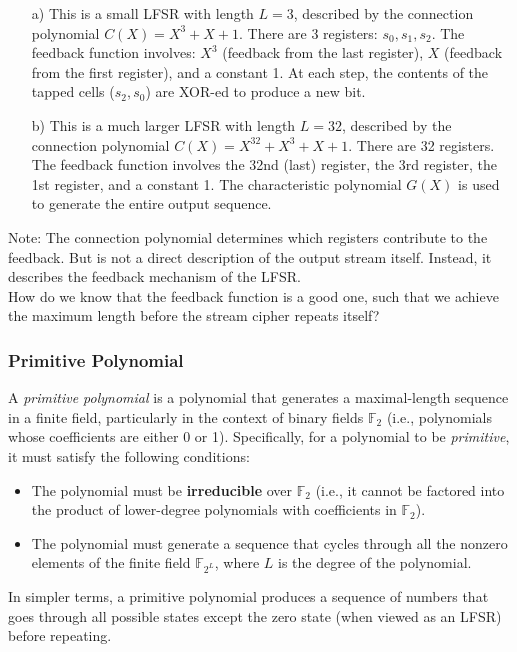 \begin{itemize}
    \item[a)] This is a small LFSR with length $L=3$, described by the connection polynomial $C(X) = X^3 + X + 1$. There are 3 registers: $s_0, s_1, s_2$. The feedback function involves: $X^3$ (feedback from the last register), $X$ (feedback from the first register), and a constant 1. At each step, the contents of the tapped cells ($s_2, s_0$) are XOR-ed to produce a new bit.
    \item[b)] This is a much larger LFSR with length $L=32$, described by the connection polynomial $C(X) = X^{32} + X^3 + X + 1$. There are 32 registers. The feedback function involves the 32nd (last) register, the 3rd register, the 1st register, and a constant 1. The characteristic polynomial $G(X)$ is used to generate the entire output sequence. 
\end{itemize}

Note: The connection polynomial determines which registers contribute to the feedback. But is not a direct description of the output stream itself. Instead, it describes the feedback mechanism of the LFSR. \\

How do we know that the feedback function is a good one, such that we achieve the maximum length before the stream cipher repeats itself?

\subsubsection{Primitive Polynomial}
\begin{defn}
A \emph{primitive polynomial} is a polynomial that generates a maximal-length sequence in a finite field, particularly in the context of binary fields $\mathbb{F}_2$ (i.e., polynomials whose coefficients are either 0 or 1). Specifically, for a polynomial to be \textit{primitive}, it must satisfy the following conditions:

\begin{itemize}
    \item The polynomial must be \textbf{irreducible} over $\mathbb{F}_2$ (i.e., it cannot be factored into the product of lower-degree polynomials with coefficients in $\mathbb{F}_2$).
    \item The polynomial must generate a sequence that cycles through all the nonzero elements of the finite field $\mathbb{F}_{2^L}$, where $L$ is the degree of the polynomial.
\end{itemize}
    
In simpler terms, a primitive polynomial produces a sequence of numbers that goes through all possible states except the zero state (when viewed as an LFSR) before repeating.
\end{defn}

